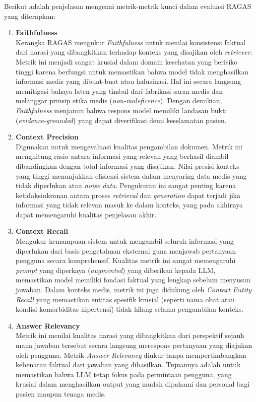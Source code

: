 Berikut adalah penjelasan mengenai metrik-metrik kunci dalam evaluasi RAGAS yang diterapkan:

\begin{enumerate}
    \item \textbf{Faithfulness}\\ Kerangka RAGAS mengukur \textit{Faithfulness} untuk menilai konsistensi faktual dari narasi yang dibangkitkan terhadap konteks yang disajikan oleh \textit{retriever}. Metrik ini menjadi sangat krusial dalam domain kesehatan yang berisiko tinggi karena berfungsi untuk memastikan bahwa model tidak menghasilkan informasi medis yang dibuat-buat atau halusinasi. Hal ini secara langsung memitigasi bahaya laten yang timbul dari fabrikasi saran medis dan melanggar prinsip etika medis (\textit{non-maleficence}). Dengan demikian, \textit{Faithfulness} menjamin bahwa respons model memiliki landasan bukti (\textit{evidence-grounded}) yang dapat diverifikasi demi keselamatan pasien.
    
    \item \textbf{Context Precision}\\ Digunakan untuk mengevaluasi kualitas pengambilan dokumen. Metrik ini menghitung rasio antara informasi yang relevan yang berhasil diambil dibandingkan dengan total informasi yang disajikan. Nilai presisi konteks yang tinggi menunjukkan efisiensi sistem dalam menyaring data medis yang tidak diperlukan atau \textit{noise data}. Pengukuran ini sangat penting karena ketidaksinkronan antara proses \textit{retrieval} dan \textit{generation} dapat terjadi jika informasi yang tidak relevan masuk ke dalam konteks, yang pada akhirnya dapat memengaruhi kualitas penjelasan akhir.
    
    \item \textbf{Context Recall}\\ Mengukur kemampuan sistem untuk mengambil seluruh informasi yang diperlukan dari basis pengetahuan eksternal guna menjawab pertanyaan pengguna secara komprehensif. Kualitas metrik ini sangat memengaruhi \textit{prompt} yang diperkaya (\textit{augmented}) yang diberikan kepada LLM, memastikan model memiliki fondasi faktual yang lengkap sebelum menyusun jawaban. Dalam konteks medis, metrik ini juga didukung oleh \textit{Context Entity Recall} yang memastikan entitas spesifik krusial (seperti nama obat atau kondisi komorbiditas hipertensi) tidak hilang selama pengambilan konteks.
    
    \item \textbf{Answer Relevancy}\\ Metrik ini menilai kualitas narasi yang dibangkitkan dari perspektif sejauh mana jawaban tersebut secara langsung merespons pertanyaan yang diajukan oleh pengguna. Metrik \textit{Answer Relevancy} diukur tanpa mempertimbangkan kebenaran faktual dari jawaban yang dihasilkan. Tujuannya adalah untuk memastikan bahwa LLM tetap fokus pada permintaan pengguna, yang krusial dalam menghasilkan output yang mudah dipahami dan personal bagi pasien maupun tenaga medis.
\end{enumerate}

